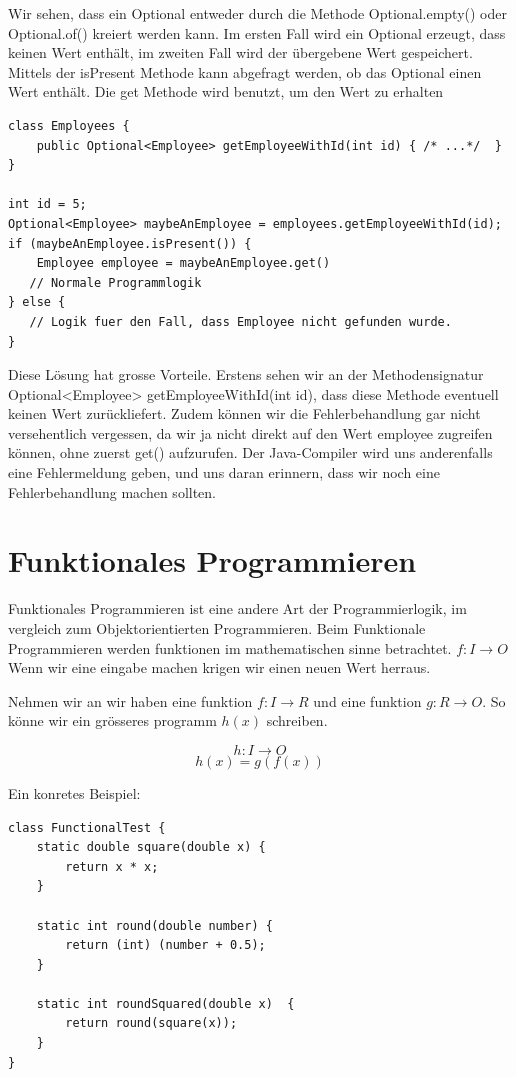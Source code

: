 \documentclass[12pt]{article}
\begin{document}
    Wir sehen, dass ein Optional entweder durch die Methode Optional.empty() oder Optional.of() kreiert werden kann. 
    Im ersten Fall wird ein Optional erzeugt, dass keinen Wert enthält, im zweiten Fall wird der übergebene Wert gespeichert. 
    Mittels der isPresent Methode kann abgefragt werden, ob das Optional einen Wert enthält. 
    Die get Methode wird benutzt, um den Wert zu erhalten

    \begin{lstlisting}
class Employees {
    public Optional<Employee> getEmployeeWithId(int id) { /* ...*/  }
}

int id = 5;
Optional<Employee> maybeAnEmployee = employees.getEmployeeWithId(id);
if (maybeAnEmployee.isPresent()) {
    Employee employee = maybeAnEmployee.get()
   // Normale Programmlogik
} else {
   // Logik fuer den Fall, dass Employee nicht gefunden wurde. 
}
    \end{lstlisting}

    Diese Lösung hat grosse Vorteile. Erstens sehen wir an der Methodensignatur Optional<Employee> getEmployeeWithId(int id), dass diese Methode eventuell keinen Wert zurückliefert. 
    Zudem können wir die Fehlerbehandlung gar nicht versehentlich vergessen, da wir ja nicht direkt auf den Wert employee zugreifen können, ohne zuerst get() aufzurufen. 
    Der Java-Compiler wird uns anderenfalls eine Fehlermeldung geben, und uns daran erinnern, dass wir noch eine Fehlerbehandlung machen sollten.

    \section*{Funktionales Programmieren}
    
    Funktionales Programmieren ist eine andere Art der Programmierlogik, im vergleich zum Objektorientierten Programmieren. 
    Beim Funktionale Programmieren werden funktionen im mathematischen sinne betrachtet. 
    $f : I \rightarrow  O$ Wenn wir eine eingabe machen krigen wir einen neuen Wert herraus. 

    Nehmen wir an wir haben eine funktion $f : I \rightarrow R$  und eine funktion $g: R \rightarrow O$. So könne wir ein 
    grösseres programm $h(x)$ schreiben. 

    $$ h: I \rightarrow O $$
    $$ h(x) = g(f(x))$$

    Ein konretes Beispiel: 

    \begin{lstlisting}
class FunctionalTest {
    static double square(double x) {
        return x * x;
    }

    static int round(double number) { 
        return (int) (number + 0.5);
    }

    static int roundSquared(double x)  {
        return round(square(x));
    }
}
    \end{lstlisting}
\end{document}
